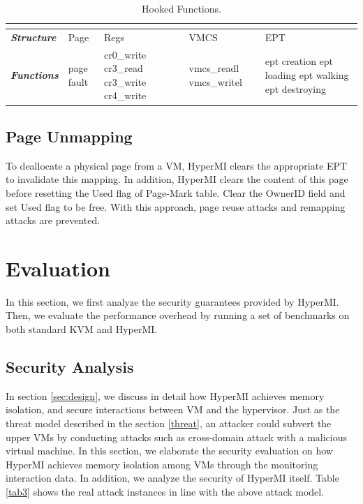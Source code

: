 \documentclass[conference]{IEEEtran}
\begin{document}
\begin{table}
\centering
\caption{Hooked Functions.}\label{tabhook}
\begin{tabular}{p{1cm}|p{1.2cm}|p{1.1cm}|p{1.4cm}|p{1.6cm}}
\hline
\multicolumn{5}{c}{\bfseries\textbf\centering{Hooked Functions}}\\
\hline
{\itshape\bfseries Structure} & Page & Regs & VMCS & EPT \\
\hline
{\itshape\bfseries Functions} &page fault & cr0\_write cr3\_read cr3\_write cr4\_write & vmcs\_readl vmcs\_writel & ept creation ept loading ept walking ept destroying \\
\hline
\end{tabular}
\end{table}

\subsection {Page Unmapping}

To deallocate a physical page from a VM, HyperMI clears the appropriate EPT to invalidate this mapping. In addition, HyperMI clears the content of this page before resetting the Used flag of Page-Mark table. Clear the OwnerID field and set Used flag to be free. With this approach, page reuse attacks and remapping attacks are prevented.
\fi


\section{Evaluation}\label{sec:evaluation}
In this section, we first analyze the security guarantees provided by HyperMI. Then, we evaluate the performance overhead by running a set of benchmarks on both standard KVM and HyperMI.



\subsection{Security Analysis}
 
In section \ref{sec:design}, we discuss in detail how HyperMI achieves memory isolation, and secure interactions between VM and the hypervisor. Just as the threat model described in the section \ref{threat}, an attacker could subvert the upper VMs by conducting attacks such as cross-domain attack with a malicious virtual machine.
In this section, we elaborate the security evaluation on how HyperMI achieves memory isolation among VMs through the monitoring interaction data. 
In addition, we analyze the security of HyperMI itself. Table \ref{tab3} shows the real attack instances in line with the above attack model. 
\end{document}
